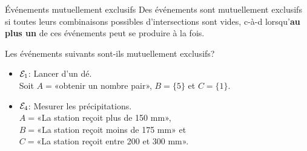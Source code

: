 \documentclass{BeamerTemplate}
\begin{document}
\begin{frame}[t]%
 \begin{Boite}{Événements mutuellement exclusifs}
  Des événements sont \alert{mutuellement exclusifs} si toutes
  leurs combinaisons possibles d'intersections sont vides, c-à-d
  lorsqu'\textbf{au plus un} de ces événements peut se produire à
  la fois. %
 \end{Boite}

 \medskip


 {\small {}}
\end{frame}


\begin{frame}[t]%

\QuizBanner

 Les événements suivants sont-ils mutuellement exclusifs?
 \medskip

 {\small  %
  \begin{itemize}\itemsep1.3cm
   \item ${\cal{E}}_1$: Lancer d'un dé.\\
   Soit $A=$«obtenir un nombre pair», $B=\{5\}$ et $C=\{1\}$. \\
   \item<2-> ${\cal{E}}_4$: Mesurer les précipitations.\\
   $A=$«La station reçoit plus de 150 mm»,\\
   $B=$«La station reçoit moins de 175 mm» et \\$C=$«La station reçoit
   entre 200 et 300 mm». \\%
   \vspace{1.3cm}
 \end{itemize}
 }
\end{frame}
\end{document}
